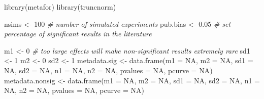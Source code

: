 \documentclass[
  oneside]{krantz}
\makeatletter
\newenvironment{Shaded}{\begin{snugshade}}{\end{snugshade}}
\newcommand{\AttributeTok}[1]{\textcolor[rgb]{0.61,0.61,0.61}{#1}}
\newcommand{\CommentTok}[1]{\textcolor[rgb]{0.37,0.37,0.37}{\textit{#1}}}
\newcommand{\ConstantTok}[1]{\textcolor[rgb]{0,0,0}{#1}}
\newcommand{\DecValTok}[1]{\textcolor[rgb]{0.06,0.06,0.06}{#1}}
\newcommand{\FloatTok}[1]{\textcolor[rgb]{0.06,0.06,0.06}{#1}}
\newcommand{\FunctionTok}[1]{\textcolor[rgb]{0,0,0}{#1}}
\newcommand{\NormalTok}[1]{#1}
\newcommand{\OtherTok}[1]{\textcolor[rgb]{0.37,0.37,0.37}{#1}}
\newenvironment{kframe}{%
\medskip{}
\setlength{\fboxsep}{.8em}
 \def\at@end@of@kframe{}%
 \ifinner\ifhmode%
  \def\at@end@of@kframe{\end{minipage}}%
  \begin{minipage}{\columnwidth}%
 \fi\fi%
 \def\FrameCommand##1{\hskip\@totalleftmargin \hskip-\fboxsep
 \colorbox{shadecolor}{##1}\hskip-\fboxsep
     \hskip-\linewidth \hskip-\@totalleftmargin \hskip\columnwidth}%
 \MakeFramed {\advance\hsize-\width
   \@totalleftmargin\z@ \linewidth\hsize
   \@setminipage}}%
 {\par\unskip\endMakeFramed%
 \at@end@of@kframe}
\renewenvironment{Shaded}{\begin{kframe}}{\end{kframe}}
\makeatother
\begin{document}
\begin{Shaded}
\begin{Highlighting}[]
\FunctionTok{library}\NormalTok{(metafor)}
\FunctionTok{library}\NormalTok{(truncnorm)}

\NormalTok{nsims }\OtherTok{\textless{}{-}} \DecValTok{100} \CommentTok{\# number of simulated experiments}
\NormalTok{pub.bias }\OtherTok{\textless{}{-}} \FloatTok{0.05} \CommentTok{\# set percentage of significant results in the literature}

\NormalTok{m1 }\OtherTok{\textless{}{-}} \DecValTok{0} \CommentTok{\# too large effects will make non{-}significant results extremely rare}
\NormalTok{sd1 }\OtherTok{\textless{}{-}} \DecValTok{1}
\NormalTok{m2 }\OtherTok{\textless{}{-}} \DecValTok{0}
\NormalTok{sd2 }\OtherTok{\textless{}{-}} \DecValTok{1}
\NormalTok{metadata.sig }\OtherTok{\textless{}{-}} \FunctionTok{data.frame}\NormalTok{(}\AttributeTok{m1 =} \ConstantTok{NA}\NormalTok{, }\AttributeTok{m2 =} \ConstantTok{NA}\NormalTok{, }\AttributeTok{sd1 =} \ConstantTok{NA}\NormalTok{, }\AttributeTok{sd2 =} \ConstantTok{NA}\NormalTok{, }
                           \AttributeTok{n1 =} \ConstantTok{NA}\NormalTok{, }\AttributeTok{n2 =} \ConstantTok{NA}\NormalTok{, }\AttributeTok{pvalues =} \ConstantTok{NA}\NormalTok{, }\AttributeTok{pcurve =} \ConstantTok{NA}\NormalTok{)}
\NormalTok{metadata.nonsig }\OtherTok{\textless{}{-}} \FunctionTok{data.frame}\NormalTok{(}\AttributeTok{m1 =} \ConstantTok{NA}\NormalTok{, }\AttributeTok{m2 =} \ConstantTok{NA}\NormalTok{, }\AttributeTok{sd1 =} \ConstantTok{NA}\NormalTok{, }\AttributeTok{sd2 =} \ConstantTok{NA}\NormalTok{, }
                              \AttributeTok{n1 =} \ConstantTok{NA}\NormalTok{, }\AttributeTok{n2 =} \ConstantTok{NA}\NormalTok{, }\AttributeTok{pvalues =} \ConstantTok{NA}\NormalTok{, }\AttributeTok{pcurve =} \ConstantTok{NA}\NormalTok{)}


\end{Highlighting}
\end{Shaded}
\end{document}
